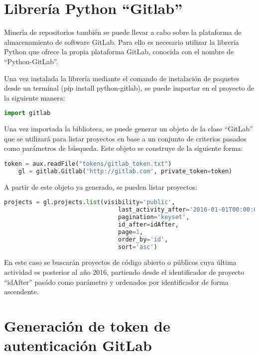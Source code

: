 \section{Librería Python ``Gitlab''}

Minería de repositorios también se puede llevar a cabo sobre la plataforma de almacenamiento de software GitLab. Para ello es necesario utilizar la librería Python que ofrece la propia plataforma GitLab, conocida con el nombre de ``Python-GitLab''.

Una vez instalada la librería mediante el comando de instalación de paquetes desde un terminal (pip install python-gitlab), se puede importar en el proyecto de la siguiente manera:

\begin{lstlisting}[language=Python]
    import gitlab
\end{lstlisting}

Una vez importada la biblioteca, se puede generar un objeto de la clase ``GitLab'' que se utilizará para listar proyectos en base a un conjunto de criterios pasados como parámetros de búsqueda. Este objeto se construye de la siguiente forma:

\begin{lstlisting}[language=Python, caption=Autenticación en API de GitLab]
    token = aux.readFile("tokens/gitlab_token.txt")
    gl = gitlab.Gitlab('http://gitlab.com', private_token=token)
\end{lstlisting}

A partir de este objeto ya generado, se pueden listar proyectos:

\begin{lstlisting}[language=Python]
    projects = gl.projects.list(visibility='public', 
                                last_activity_after='2016-01-01T00:00:00Z', 
                                pagination='keyset', 
                                id_after=idAfter, 
                                page=1, 
                                order_by='id', 
                                sort='asc')
\end{lstlisting}

En este caso se buscarán proyectos de código abierto o públicos cuya última actividad es posterior al año 2016, partiendo desde el identificador de proyecto ``idAfter'' pasádo como parámetro y ordenados por identificador de forma ascendente.

\section{Generación de token de autenticación GitLab}

